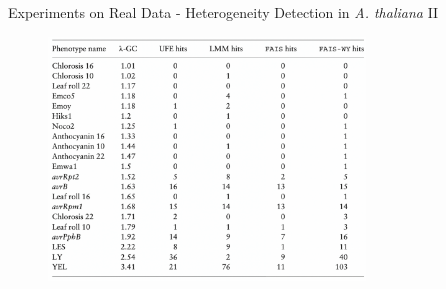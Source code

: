 \documentclass[aspectratio=32, 10pt]{beamer}
\begin{document}
\begin{frame}[fragile]{Experiments on Real Data - Heterogeneity Detection in \textit{A. thaliana} II }
\begin{figure}
    \centering
    \includegraphics[width=0.75\textwidth]{figures/A_thaliana.png}
\end{figure}
\end{frame}




    
\end{document}
